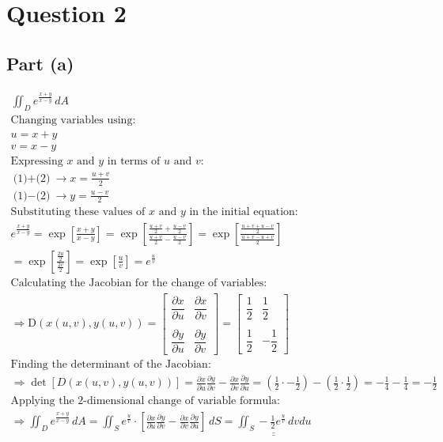\documentclass[letterpaper,10pt]{article}
\newcommand{\doubleu}[1]{\underline{\underline{#1}}}
\newcommand{\partiald}[2]{\frac{\partial #1}{\partial #2}}
\newcommand{\matrixpartiald}[2]{\dfrac{\partial #1}{\partial #2}}
\begin{document}
	\section{Question 2}
		\subsection{Part (a)}
			\begin{gather*}
				\iint_D e^{\frac{x+y}{x-y}} \, dA \\
				\text{Changing variables using:} \\
				u = x + y \tag{1} \\
				v = x - y \tag{2} \\
				\text{Expressing $x$ and $y$ in terms of $u$ and $v$:} \\
				\text{(1)$+$(2)} \rightarrow x = \frac{u+v}{2} \\
				\text{(1)$-$(2)} \rightarrow y = \frac{u-v}{2} \\
				\text{Substituting these values of $x$ and $y$ in the initial equation:} \\
				e^{\frac{x+y}{x-y}} = \exp{\left[ \frac{x+y}{x-y} \right]} = \exp{ \left[ \frac{ \frac{u+v}{2} + \frac{u-v}{2} }{ \frac{u+v}{2} - \frac{u-v}{2} } \right]} = \exp{ \left[ \frac{ \frac{u+v+u-v}{2} }{ \frac{u+v-u+v}{2} } \right]} \\
				= \exp {\left[ \frac{ \frac{2u}{2} }{ \frac{2v}{2} } \right]} = \exp{\left[ \frac{u}{v} \right]} = e^{\frac{u}{v}} \\
				\text{Calculating the Jacobian for the change of variables:} \\
				\Rightarrow \text{D}(x(u,v), y(u,v)) =
				\begin{bmatrix}
					\matrixpartiald{x}{u} & \matrixpartiald{x}{v} \\
					\\
					\matrixpartiald{y}{u} & \matrixpartiald{y}{v}
				\end{bmatrix}
				=
				\begin{bmatrix}
					\dfrac{1}{2} & \dfrac{1}{2} \\
					\\
					\dfrac{1}{2} & -\dfrac{1}{2}
				\end{bmatrix} \\
				\text{Finding the determinant of the Jacobian:} \\
				\Rightarrow \det \left[ D(x(u,v), y(u,v)) \right] = \partiald{x}{u}\partiald{y}{v} - \partiald{x}{v}\partiald{y}{u} = \left( \frac{1}{2} \cdot -\frac{1}{2} \right) - \left( \frac{1}{2} \cdot \frac{1}{2} \right) = -\frac{1}{4} - \frac{1}{4} = -\frac{1}{2} \\
				\text{Applying the 2-dimensional change of variable formula:} \\
				\Rightarrow \iint_D e^{\frac{x+y}{x-y}} \, dA = \iint_S e^{\frac{u}{v}} \cdot \left[ \partiald{x}{u}\partiald{y}{v} - \partiald{x}{v}\partiald{y}{u} \right] \, dS = \doubleu{ \iint_S -\frac{1}{2} e^{\frac{u}{v}} \, dvdu }
			\end{gather*}
\end{document}
